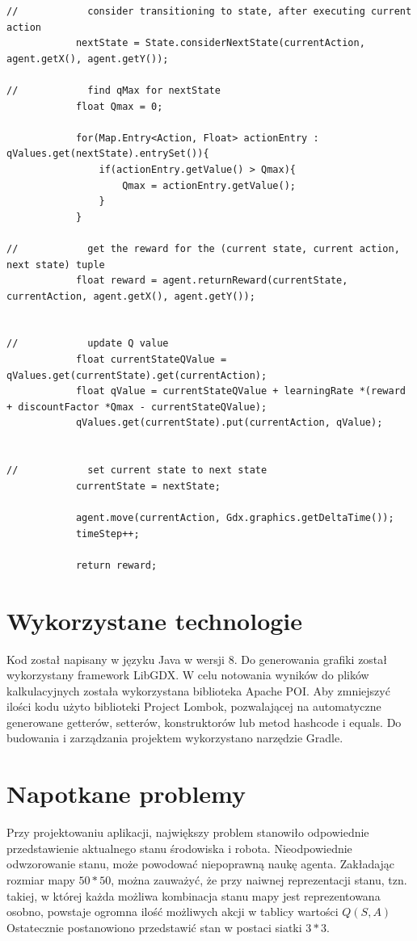 \begin{lstlisting}[caption=Implementacja algorytmu Q-learning, label={lst:qlearning}, captionpos=b, 
belowcaptionskip=4pt]
//            consider transitioning to state, after executing current action
            nextState = State.considerNextState(currentAction, agent.getX(), agent.getY());

//            find qMax for nextState
            float Qmax = 0;

            for(Map.Entry<Action, Float> actionEntry : qValues.get(nextState).entrySet()){
                if(actionEntry.getValue() > Qmax){
                    Qmax = actionEntry.getValue();
                }
            }

//            get the reward for the (current state, current action, next state) tuple
            float reward = agent.returnReward(currentState, currentAction, agent.getX(), agent.getY());


//            update Q value
            float currentStateQValue = qValues.get(currentState).get(currentAction);
            float qValue = currentStateQValue + learningRate *(reward + discountFactor *Qmax - currentStateQValue);
            qValues.get(currentState).put(currentAction, qValue);


//            set current state to next state
            currentState = nextState;

            agent.move(currentAction, Gdx.graphics.getDeltaTime());
            timeStep++;

            return reward;
\end{lstlisting}

\section{Wykorzystane technologie}
\label{sec:wykorzystanetechnologie}

Kod został napisany w języku Java w wersji 8. Do generowania grafiki został wykorzystany framework LibGDX. W celu 
notowania wyników do plików kalkulacyjnych została wykorzystana biblioteka Apache POI.
Aby zmniejszyć ilości kodu użyto biblioteki Project Lombok, pozwalającej na automatyczne generowane getterów, 
setterów, konstruktorów lub metod hashcode i equals. Do budowania i zarządzania projektem wykorzystano narzędzie Gradle.

\section{Napotkane problemy}
\label{sec:napotkaneproblemy}

Przy projektowaniu aplikacji, największy problem stanowiło odpowiednie przedstawienie aktualnego stanu środowiska i robota. Nieodpowiednie odwzorowanie stanu, może powodować niepoprawną naukę agenta.
Zakładając rozmiar mapy $50*50$, można zauważyć, że przy naiwnej reprezentacji stanu, tzn. takiej, w której każda możliwa kombinacja stanu mapy jest reprezentowana osobno, powstaje ogromna ilość możliwych akcji w tablicy wartości $Q(S,A)$ 
Ostatecznie postanowiono przedstawić stan w postaci siatki $3*3$.

